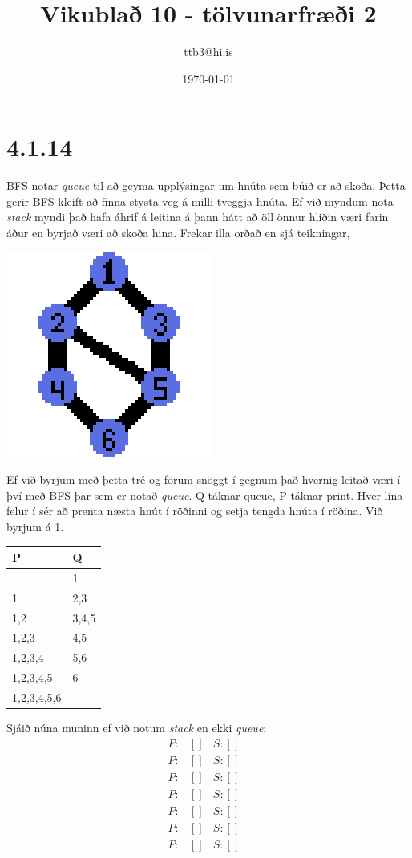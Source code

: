 \documentclass{article}
\title{Vikublað 10 - tölvunarfræði 2}
\author{ttb3@hi.is}
\date{\today}
\begin{document}
\maketitle


\section*{4.1.14}
BFS notar \emph{queue} til að geyma upplýsingar um hnúta sem búið er að skoða.
Þetta gerir BFS kleift að finna stysta veg á milli tveggja hnúta.
Ef við myndum nota \emph{stack} myndi það hafa áhrif á leitina á þann hátt að öll önnur hliðin væri farin áður en byrjað væri að skoða hina.
Frekar illa orðað en sjá teikningar,
\begin{center}
    \includegraphics{graph.png}
\end{center}
Ef við byrjum með þetta tré og förum snöggt í gegnum það hvernig leitað væri í því með BFS þar sem er notað \emph{queue}.
Q táknar queue, P táknar print. Hver lína felur í sér að prenta næsta hnút í röðinni og setja tengda hnúta í röðina. Við byrjum á 1.\\

\begin{tabular}{|l|l|}
    \hline
    P&Q\\
    \hline
                &1\\
                \hline
    1           &2,3\\
    \hline
    1,2         &3,4,5\\
    \hline
    1,2,3       &4,5\\
    \hline
    1,2,3,4     &5,6\\
    \hline
    1,2,3,4,5   &6\\
    \hline
    1,2,3,4,5,6 &\\
    \hline
\end{tabular}

Sjáið núna muninn ef við notum \emph{stack} en ekki \emph{queue}:
\begin{align*}
    P:&[] & S:[]&\\ 
    P:&[] & S:[]&\\ 
    P:&[] & S:[]&\\ 
    P:&[] & S:[]&\\ 
    P:&[] & S:[]&\\ 
    P:&[] & S:[]&\\ 
    P:&[] & S:[]& 
\end{align*}
\end{document}
